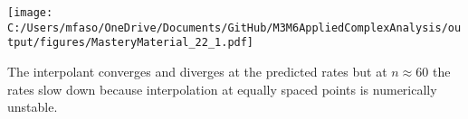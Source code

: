 \documentclass[12pt,a4paper]{article}
\begin{document}
\texttt{[image: C:/Users/mfaso/OneDrive/Documents/GitHub/M3M6AppliedComplexAnalysis/output/figures/MasteryMaterial\_22\_1.pdf]}

The interpolant converges and diverges at the predicted rates but at $n \approx 60$ the rates slow down because interpolation at equally spaced points is numerically unstable.
\end{document}
